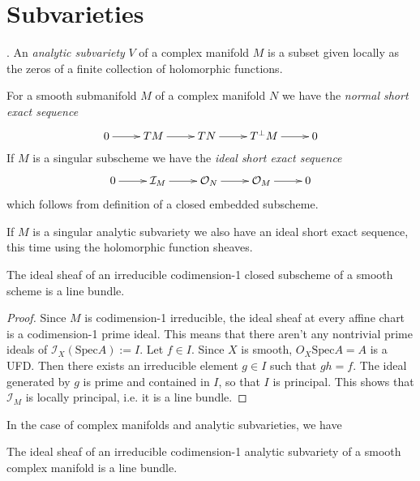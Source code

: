 \section{Subvarieties}
\label{section-subvarieties}

\begin{definition}
\label{definition-analytic-subvariety}
\cite{gri}. An {\it analytic subvariety} $V$ of a complex manifold $M$ is a
subset given locally as the zeros of a finite collection of holomorphic
functions.
\end{definition}

For a smooth submanifold $M$ of a complex manifold $N$ we have the {\it normal 
short exact sequence}
$$
\xymatrix{
0\ar[r]&TM\ar[r]&TN\ar[r]&T^\perp M\ar[r]&0
}
$$
If $M$ is a singular subscheme we have the {\it ideal short exact sequence}
$$
\xymatrix{
0\ar[r]&\mathcal{I}_M\ar[r]&\mathcal{O}_N\ar[r]&\mathcal{O}_M\ar[r]&0
}
$$
which follows from definition of a closed embedded subscheme.

If $M$ is a singular analytic subvariety we also have an ideal short exact
sequence, this time using the holomorphic function sheaves.

\begin{lemma}
\label{lemma-ideal-sheaf-is-line-bundle-schemes}
The ideal sheaf of an irreducible codimension-1 closed subscheme of a smooth
scheme is a line bundle.
\end{lemma}

\begin{proof}
Since $M$ is codimension-1 irreducible, the ideal sheaf at every affine chart is
a codimension-1 prime ideal. This means that there aren't any nontrivial prime
ideals of $\mathcal{I}_X(\text{Spec}A):=I$. Let $f\in I$.
Since $X$ is smooth, $O_X\text{Spec}A=A$ is a UFD. Then there exists an
irreducible element $g\in I$ such that $gh=f$. The ideal generated by $g$ is
prime and contained in $I$, so that $I$ is principal. This shows that
$\mathcal{I}_M$ is locally principal, i.e. it is a line bundle.
\end{proof}

In the case of complex manifolds and analytic subvarieties, we have

\begin{lemma}
\label{lemma-ideal-sheaf-is-line-bundle-analytic-varieties}
The ideal sheaf of an irreducible codimension-1 analytic subvariety of a smooth
complex manifold is a line bundle.
\end{lemma}

